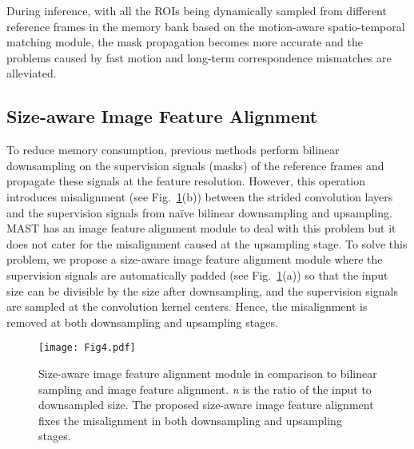 \documentclass[letterpaper]{article} \usepackage{aaai22}  \usepackage{times}  \usepackage{helvet}  \usepackage{courier}  \usepackage[hyphens]{url}  \usepackage{graphicx} \urlstyle{rm} \def\UrlFont{\rm}  \usepackage{natbib}  \usepackage{caption} \DeclareCaptionStyle{ruled}{labelfont=normalfont,labelsep=colon,strut=off} \frenchspacing  \setlength{\pdfpagewidth}{8.5in}  \setlength{\pdfpageheight}{11in}  \usepackage{algorithm}
\begin{document}
During inference, with all the ROIs being dynamically sampled from different reference frames in the memory bank based on the motion-aware spatio-temporal matching module, the mask propagation becomes more accurate and the problems caused by fast motion and long-term correspondence mismatches are alleviated.


\subsection{Size-aware Image Feature Alignment}
To reduce memory consumption, previous methods perform bilinear downsampling on the supervision signals (masks) of the reference frames and propagate these signals at the feature resolution. However, this operation introduces misalignment (see Fig.~\ref{fig:4}(b)) between the strided convolution layers and the supervision signals from na\"ive bilinear downsampling and upsampling. MAST \cite{MAST} has an image feature alignment module to deal with this problem but it does not cater for the misalignment caused at the upsampling stage. To solve this problem, we propose a size-aware image feature alignment module where the supervision signals are automatically padded (see Fig.~\ref{fig:4}(a)) so that the input size can be divisible by the size after downsampling, and the supervision signals are sampled at the convolution kernel centers. Hence, the misalignment is removed at both downsampling and upsampling stages.

\begin{figure}[t] \centering
\texttt{[image: Fig4.pdf]}
\caption{Size-aware image feature alignment module in comparison to bilinear sampling and image feature alignment. \emph{n} is the ratio of the input to downsampled size. The proposed size-aware image feature alignment fixes the misalignment in both downsampling and upsampling stages.} \label{fig:4}
\end{figure}
\end{document}
